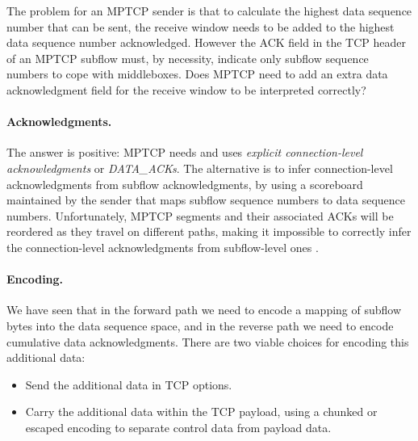 The problem for an MPTCP sender is that to calculate the highest data sequence number that can be sent, 
the receive window needs to be added to the highest data sequence number acknowledged. However the ACK 
field in the TCP header of an MPTCP subflow must, by necessity,
indicate only subflow sequence numbers to cope with middleboxes. 
Does MPTCP need to add an extra data acknowledgment field for the receive window to be interpreted correctly?

\paragraph{Acknowledgments.} 
The answer is positive: MPTCP needs and uses \emph{explicit
connection-level acknowledgments} or \emph{DATA\_ACKs}. The alternative is to infer connection-level
acknowledgments from subflow acknowledgments, by using a scoreboard maintained by the sender that maps
subflow sequence numbers to data sequence numbers. Unfortunately, MPTCP segments and their associated ACKs
will be reordered as they travel on different paths, making it impossible to correctly infer the connection-level
acknowledgments from subflow-level ones \cite{raiciu2012hard}.

\paragraph{Encoding.}
We have seen that in the forward path we need to encode a mapping of
subflow bytes into the data sequence space, and in the reverse path we
need to encode cumulative data acknowledgments.  There are two viable
choices for encoding this additional data:
\begin{itemize}
\item Send the additional data in TCP options.
\item Carry the additional data within the TCP payload, using a
  chunked or escaped encoding to separate control data from payload
  data.
\end{itemize}

